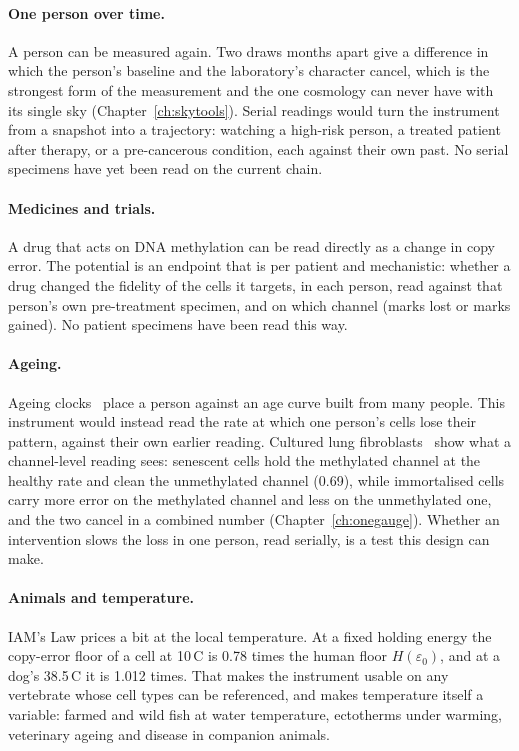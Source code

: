 \paragraph{One person over time.} A person can be measured again. Two draws months apart give a difference in which the person's baseline and
the laboratory's character cancel, which is the strongest form of the measurement and the one cosmology can never have with its single sky
(Chapter~\ref{ch:skytools}). Serial readings would turn the instrument from a snapshot into a trajectory: watching a high-risk person, a
treated patient after therapy, or a pre-cancerous condition, each against their own past. \prediction{} No serial specimens have yet been read
on the current chain.

\paragraph{Medicines and trials.} A drug that acts on DNA methylation can be read directly as a change in copy error. The potential is an endpoint that is per patient and mechanistic: whether a drug changed
the fidelity of the cells it targets, in each person, read against that person's own pre-treatment specimen, and on which channel (marks lost
or marks gained). No patient specimens have been read this way. \openprob

\paragraph{Ageing.} Ageing clocks~\cite{Horvath2013} place a person against an age curve built from many people. This instrument would instead read the
rate at which one person's cells lose their pattern, against their own earlier reading. Cultured lung fibroblasts~\cite{Cruickshanks2013} show what a channel-level
reading sees: senescent cells hold the methylated channel at the healthy rate and clean the unmethylated channel (0.69), while immortalised
cells carry more error on the methylated channel and less on the unmethylated one, and the two cancel in a combined number
(Chapter~\ref{ch:onegauge}). \measured{} Whether an intervention slows the loss in one person, read serially, is a test this design can make.
\prediction

\paragraph{Animals and temperature.} IAM's Law prices a bit at the local temperature. At a fixed holding energy the copy-error floor of a cell
at 10\,\textdegree C is 0.78 times the human floor $H(\varepsilon_0)$, and at a dog's 38.5\,\textdegree C it is 1.012 times. \calc{} That makes the
instrument usable on any vertebrate whose cell types can be referenced, and makes temperature itself a variable: farmed and wild fish at
water temperature, ectotherms under warming, veterinary ageing and disease in companion animals. \prediction

